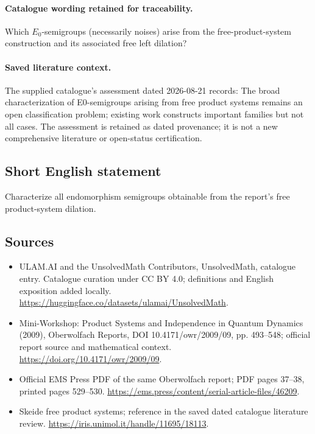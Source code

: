 \documentclass[11pt]{article}
\begin{document}
\paragraph{Catalogue wording retained for traceability.}
Which $E_0$-semigroups (necessarily noises) arise from the free-product-system construction and its associated free left dilation?

\paragraph{Saved literature context.} The supplied catalogue's assessment dated 2026-08-21 records: The broad characterization of E0-semigroups arising from free product systems remains an open classification problem; existing work constructs important families but not all cases. The assessment is retained as dated provenance; it is not a new comprehensive literature or open-status certification.
\subsection{Short English statement}
Characterize all endomorphism semigroups obtainable from the report's free product-system dilation.
\subsection{Sources}
\begin{itemize}
\item[\hypertarget{source:statement:1}{S1}] ULAM.AI and the UnsolvedMath Contributors, UnsolvedMath, catalogue entry. Catalogue curation under CC BY 4.0; definitions and English exposition added locally.
\url{https://huggingface.co/datasets/ulamai/UnsolvedMath}.
\item[\hypertarget{source:statement:2}{S2}] Mini-Workshop: Product Systems and Independence in Quantum Dynamics (2009), Oberwolfach Reports, DOI 10.4171/owr/2009/09, pp. 493--548; official report source and mathematical context.
\url{https://doi.org/10.4171/owr/2009/09}.
\item[\hypertarget{source:statement:3}{S3}] Official EMS Press PDF of the same Oberwolfach report; PDF pages 37--38, printed pages 529--530.
\url{https://ems.press/content/serial-article-files/46209}.
\item[\hypertarget{source:statement:4}{S4}] Skeide free product systems; reference in the saved dated catalogue literature review.
\url{https://iris.unimol.it/handle/11695/18113}.
\end{itemize}
\label{end:statement}
\end{document}
